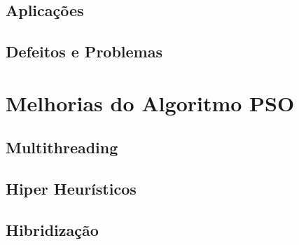 \subsection{Aplicações}
\lipsum[3]

\subsection{Defeitos e Problemas}
\lipsum[2]

\section{Melhorias do Algoritmo PSO}
\lipsum[2]

\subsection{Multithreading}
\lipsum[2]

\subsection{Hiper Heurísticos}
\lipsum[2]

\subsection{Hibridização}
\lipsum[2]



